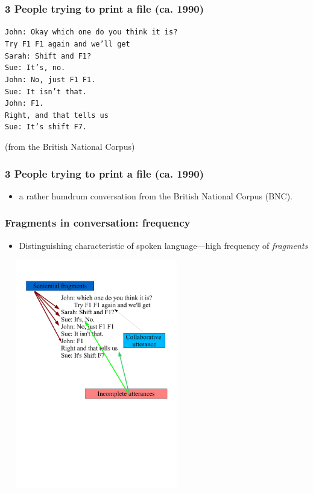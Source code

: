 \documentclass{beamer}
\newcommand{\bit}{\begin{itemize}}
\newcommand{\eit}{\end{itemize}}
\begin{document}
\begin{frame}\frametitle{3 People trying to print a file
    (ca. 1990)} 

{\tt John:	Okay which one do you think it is?\\
\hspace{1cm}	Try F1 F1  again and we'll get \\
Sarah:	Shift and F1?  \\
Sue:	It's,  no. \\
John:	No, just F1  F1. \\
Sue:	It isn't that. \\
John:	F1. \\
	Right, and that tells us \\
Sue:	It's shift F7.} 

\hspace{1in} (from the British National Corpus)

\end{frame}

\begin{frame}\frametitle{3 People trying to print a file
    (ca. 1990)} 

\bit
\item a rather humdrum conversation from the British
National Corpus (BNC).


  
\eit

\end{frame}

\begin{frame}[label=runningex1]\frametitle{Fragments in conversation: frequency}

\bit
\item Distinguishing characteristic of spoken language---high
  frequency of {\it fragments}
\eit
\includegraphics[height=10cm,width=8cm]{challenges0.pdf}

\end{frame}
\end{document}
